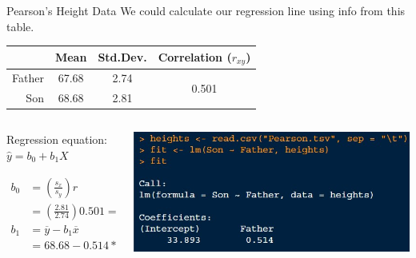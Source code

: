 \documentclass{beamer}
\begin{document}
\begin{frame}{Pearson's Height Data}
We could calculate our regression line using info from this table.

\begin{table}[ht]
\centering
\footnotesize
\begin{tabular}{rccc}
  \hline
& Mean & Std.Dev. & Correlation ($r_{xy}$)\\ 
  \hline
Father & 67.68 & 2.74 & \multirow{2}{*}{0.501} \\ 
Son &  68.68 & 2.81 & \\ 
   \hline
\end{tabular}
\end{table} \vspace{3mm}

\begin{columns}
 \begin{column}{0.45\textwidth}
Regression equation: $\hat{y} = b_0 + b_1X$

\begin{align*}
b_0 & = (\frac{s_x}{s_y})r \\
& = (\frac{2.81}{2.74})0.501 = 0.514
\end{align*}
\begin{align*}
b_1 & = \overline{y}-b_1 \overline{x} \\
& = 68.68 - 0.514*67.68 = 33.893
\end{align*}
 \end{column}
 \begin{column}{0.45\textwidth}
\includegraphics[scale=.55]{img/pearson_heights_regression_coef.jpg}
 \end{column}
\end{columns}
\end{frame}
\end{document}
